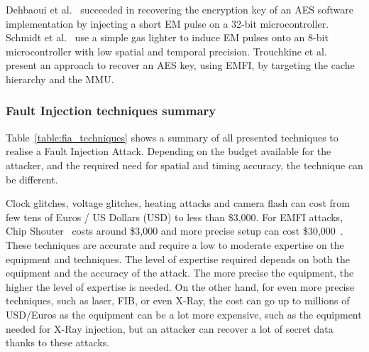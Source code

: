 Dehbaoui et al.~\cite{DMMDT-13-cosade} succeeded in recovering the encryption key of an AES software implementation by injecting a short EM pulse on a 32-bit microcontroller.
Schmidt et al.~\cite{SH-07-austrochip} use a simple gas lighter to induce EM pulses onto an 8-bit microcontroller with low spatial and temporal precision.
Trouchkine et al.~\cite{TBELB-21-jce} present an approach to recover an AES key, using EMFI, by targeting the cache hierarchy and the MMU.

\subsubsection{Fault Injection techniques summary}
Table~\ref{table:fia_techniques} shows a summary of all presented techniques to realise a Fault Injection Attack. Depending on the budget available for the attacker, and the required need for spatial and timing accuracy, the technique can be different.

Clock glitches, voltage glitches, heating attacks and camera flash can cost from few tens of Euros / US Dollars (USD) to less than \$3,000. For EMFI attacks, Chip Shouter~\cite{chipshouter} costs around \$3,000 and more precise setup can cost \$30,000~\cite{BH-22-access}. These techniques are accurate and require a low to moderate expertise on the equipment and techniques. The level of expertise required depends on both the equipment and the accuracy of the attack. The more precise the equipment, the higher the level of expertise is needed. On the other hand, for even more precise techniques, such as laser, FIB, or even X-Ray, the cost can go up to millions of USD/Euros as the equipment can be a lot more expensive, such as the equipment needed for X-Ray injection, but an attacker can recover a lot of secret data thanks to these attacks.

